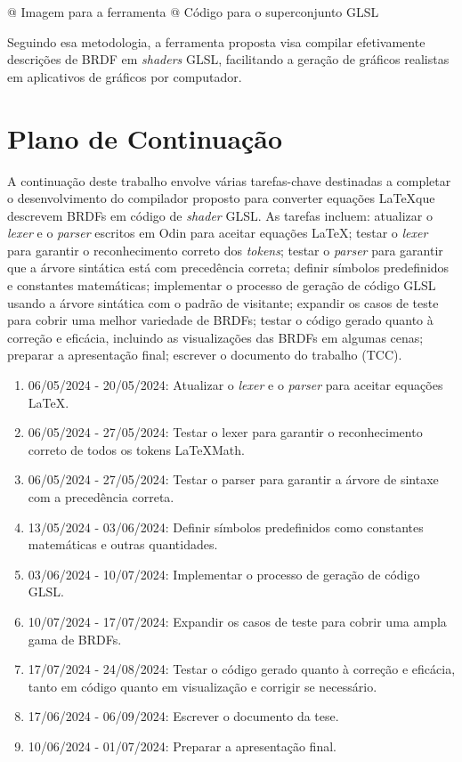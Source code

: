 \documentclass[english, 
               brazil, 
               bsc] %
               {dcomp-abntex2}
\begin{document}
@ Imagem para a ferramenta
@ Código para o superconjunto GLSL

Seguindo esa metodologia, a ferramenta proposta visa compilar efetivamente descrições de BRDF em \textit{shaders} GLSL, facilitando a geração de gráficos realistas em aplicativos de gráficos por computador.

\section{Plano de Continuação} \label{continuacao}

A continuação deste trabalho envolve várias tarefas-chave destinadas a completar o desenvolvimento do compilador proposto para converter equações \LaTeX  que descrevem BRDFs em código de \textit{shader} GLSL. As tarefas incluem: atualizar o \textit{lexer} e o \textit{parser} escritos em Odin para aceitar equações \LaTeX; testar o \textit{lexer} para garantir o reconhecimento correto dos \textit{tokens}; testar o \textit{parser} para garantir que a árvore sintática está com precedência correta; definir símbolos predefinidos e constantes matemáticas; implementar o processo de geração de código GLSL usando a árvore sintática com o padrão de visitante; expandir os casos de teste para cobrir uma melhor variedade de BRDFs; testar o código gerado quanto à correção e eficácia, incluindo as visualizações das BRDFs em algumas cenas; preparar a apresentação final; escrever o documento do trabalho (TCC).

\begin{enumerate}
  \item 06/05/2024 - 20/05/2024: Atualizar o \textit{lexer} e o \textit{parser} para aceitar equações \LaTeX.

\item 06/05/2024 - 27/05/2024: Testar o lexer para garantir o reconhecimento correto de todos os tokens \LaTeX  Math.
\item 06/05/2024 - 27/05/2024: Testar o parser para garantir a árvore de sintaxe com a precedência correta.
\item 13/05/2024 - 03/06/2024: Definir símbolos predefinidos como constantes matemáticas e outras quantidades.
\item 03/06/2024 - 10/07/2024: Implementar o processo de geração de código GLSL.
\item 10/07/2024 - 17/07/2024: Expandir os casos de teste para cobrir uma ampla gama de BRDFs.
\item 17/07/2024 - 24/08/2024: Testar o código gerado quanto à correção e eficácia, tanto em código quanto em visualização e corrigir se necessário.
\item 17/06/2024 - 06/09/2024: Escrever o documento da tese.
\item 10/06/2024 - 01/07/2024: Preparar a apresentação final.
\end{enumerate}
\end{document}

